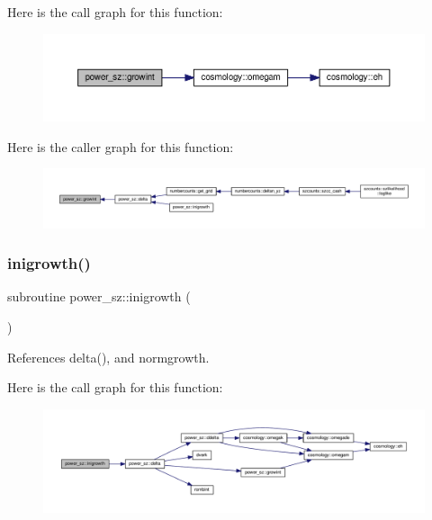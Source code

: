 Here is the call graph for this function\+:
\nopagebreak
\begin{figure}[H]
\begin{center}
\leavevmode
\includegraphics[width=350pt]{namespacepower__sz_ad0eb7df0cb325285d971ac5aa7c80754_cgraph}
\end{center}
\end{figure}
Here is the caller graph for this function\+:
\nopagebreak
\begin{figure}[H]
\begin{center}
\leavevmode
\includegraphics[width=350pt]{namespacepower__sz_ad0eb7df0cb325285d971ac5aa7c80754_icgraph}
\end{center}
\end{figure}
\mbox{\label{namespacepower__sz_aba87ceb74647bba3404b96101f438d35}} 
\subsubsection{\texorpdfstring{inigrowth()}{inigrowth()}}
{\footnotesize\ttfamily subroutine power\+\_\+sz\+::inigrowth (\begin{DoxyParamCaption}{ }\end{DoxyParamCaption})}



References delta(), and normgrowth.

Here is the call graph for this function\+:
\nopagebreak
\begin{figure}[H]
\begin{center}
\leavevmode
\includegraphics[width=350pt]{namespacepower__sz_aba87ceb74647bba3404b96101f438d35_cgraph}
\end{center}
\end{figure}


